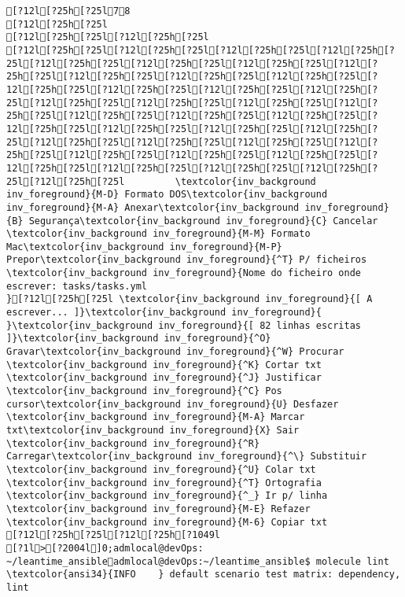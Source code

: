 \documentclass{scrartcl}
\begin{document}
\begin{Verbatim}
[?12l[?25h[?25l78
[?12l[?25h[?25l
[?12l[?25h[?25l[?12l[?25h[?25l
[?12l[?25h[?25l[?12l[?25h[?25l[?12l[?25h[?25l[?12l[?25h[?25l[?12l[?25h[?25l[?12l[?25h[?25l[?12l[?25h[?25l[?12l[?25h[?25l[?12l[?25h[?25l[?12l[?25h[?25l[?12l[?25h[?25l[?12l[?25h[?25l[?12l[?25h[?25l[?12l[?25h[?25l[?12l[?25h[?25l[?12l[?25h[?25l[?12l[?25h[?25l[?12l[?25h[?25l[?12l[?25h[?25l[?12l[?25h[?25l[?12l[?25h[?25l[?12l[?25h[?25l[?12l[?25h[?25l[?12l[?25h[?25l[?12l[?25h[?25l[?12l[?25h[?25l[?12l[?25h[?25l[?12l[?25h[?25l[?12l[?25h[?25l[?12l[?25h[?25l[?12l[?25h[?25l[?12l[?25h[?25l[?12l[?25h[?25l[?12l[?25h[?25l[?12l[?25h[?25l[?12l[?25h[?25l[?12l[?25h[?25l[?12l[?25h[?25l         \textcolor{inv_background inv_foreground}{M-D} Formato DOS\textcolor{inv_background inv_foreground}{M-A} Anexar\textcolor{inv_background inv_foreground}{B} Segurança\textcolor{inv_background inv_foreground}{C} Cancelar           \textcolor{inv_background inv_foreground}{M-M} Formato Mac\textcolor{inv_background inv_foreground}{M-P} Prepor\textcolor{inv_background inv_foreground}{^T} P/ ficheiros
\textcolor{inv_background inv_foreground}{Nome do ficheiro onde escrever: tasks/tasks.yml                                                                                           }[?12l[?25h[?25l \textcolor{inv_background inv_foreground}{[ A escrever... ]}\textcolor{inv_background inv_foreground}{          }\textcolor{inv_background inv_foreground}{[ 82 linhas escritas ]}\textcolor{inv_background inv_foreground}{^O} Gravar\textcolor{inv_background inv_foreground}{^W} Procurar      \textcolor{inv_background inv_foreground}{^K} Cortar txt    \textcolor{inv_background inv_foreground}{^J} Justificar    \textcolor{inv_background inv_foreground}{^C} Pos cursor\textcolor{inv_background inv_foreground}{U} Desfazer     \textcolor{inv_background inv_foreground}{M-A} Marcar txt\textcolor{inv_background inv_foreground}{X} Sair    \textcolor{inv_background inv_foreground}{^R} Carregar\textcolor{inv_background inv_foreground}{^\} Substituir    \textcolor{inv_background inv_foreground}{^U} Colar txt     \textcolor{inv_background inv_foreground}{^T} Ortografia    \textcolor{inv_background inv_foreground}{^_} Ir p/ linha   \textcolor{inv_background inv_foreground}{M-E} Refazer      \textcolor{inv_background inv_foreground}{M-6} Copiar txt
[?12l[?25h[?25l[?12l[?25h[?1049l
[?1l>[?2004l]0;admlocal@devOps: ~/leantime_ansibleadmlocal@devOps:~/leantime_ansible$ molecule lint
\textcolor{ansi34}{INFO    } default scenario test matrix: dependency, lint

\end{Verbatim}
\end{document}
